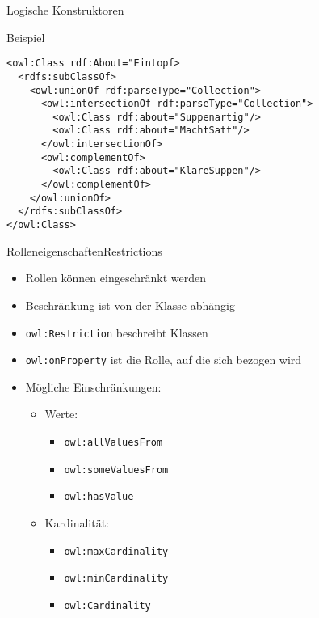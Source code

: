 \documentclass{beamer}
\begin{document}
%
\begin{frame}[fragile]{Logische Konstruktoren}
\begin{exampleblock}{Beispiel}
\begin{lstlisting}[lang="xml"]
<owl:Class rdf:About="Eintopf>
  <rdfs:subClassOf>
    <owl:unionOf rdf:parseType="Collection">
      <owl:intersectionOf rdf:parseType="Collection">
        <owl:Class rdf:about="Suppenartig"/>
        <owl:Class rdf:about="MachtSatt"/>
      </owl:intersectionOf>
      <owl:complementOf>
        <owl:Class rdf:about="KlareSuppen"/>
      </owl:complementOf>
    </owl:unionOf>
  </rdfs:subClassOf>
</owl:Class>
\end{lstlisting}
\end{exampleblock}

\end{frame}
%

\begin{frame}[fragile]{Rolleneigenschaften}{Restrictions}
\begin{itemize}
\item Rollen können eingeschränkt werden
\item Beschränkung ist von der Klasse abhängig
\item \texttt{owl:Restriction} beschreibt Klassen
\item \texttt{owl:onProperty} ist die Rolle, auf die sich bezogen wird
\item Mögliche Einschränkungen:
\begin{itemize}
\item Werte:
\begin{itemize}
\item \texttt{owl:allValuesFrom}
\item \texttt{owl:someValuesFrom}
\item \texttt{owl:hasValue}
\end{itemize}
\item Kardinalität:
\begin{itemize}
\item \texttt{owl:maxCardinality}
\item \texttt{owl:minCardinality}
\item \texttt{owl:Cardinality}
\end{itemize}

\end{itemize}

\end{itemize}


\end{frame}
%
\end{document}
